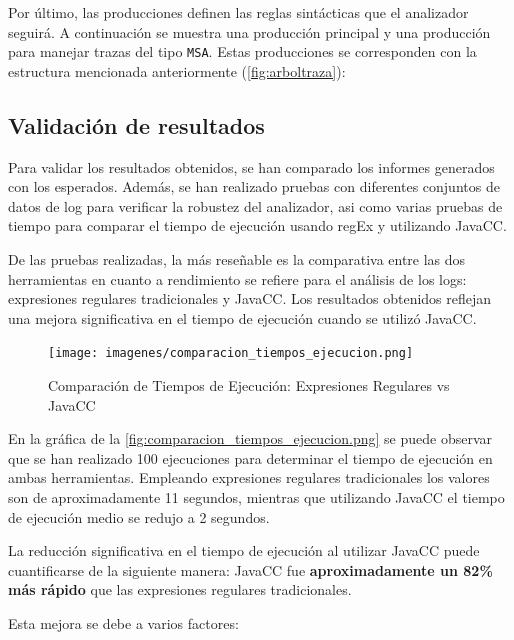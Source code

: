 Por último, las producciones definen las reglas sintácticas que el analizador seguirá. A continuación se muestra una producción principal y una producción para manejar trazas del tipo \lstinline|MSA|. Estas producciones se corresponden con la estructura mencionada anteriormente (\autoref{fig:arboltraza}):

\lstset{inputencoding=utf8/latin1}


\subsection{Validación de resultados}

\noindent Para validar los resultados obtenidos, se han comparado los informes generados con los esperados. Además, se han realizado pruebas con diferentes conjuntos de datos de log para verificar la robustez del analizador, asi como varias pruebas de tiempo para comparar el tiempo de ejecución usando regEx y utilizando JavaCC. 

De las pruebas realizadas, la más reseñable es la comparativa entre las dos herramientas en cuanto a rendimiento se refiere para el análisis de los logs: expresiones regulares tradicionales y JavaCC. Los resultados obtenidos reflejan una mejora significativa en el tiempo de ejecución cuando se utilizó JavaCC.

\begin{figure}[H]
\centering
\texttt{[image: imagenes/comparacion\_tiempos\_ejecucion.png]}
\caption{Comparación de Tiempos de Ejecución: Expresiones Regulares vs JavaCC}
\label{fig:comparacion_tiempos_ejecucion.png}
\end{figure}

\noindent En la gráfica de la \autoref{fig:comparacion_tiempos_ejecucion.png} se puede observar que se han realizado 100 ejecuciones para determinar el tiempo de ejecución en ambas herramientas. Empleando expresiones regulares tradicionales los valores son de aproximadamente 11 segundos, mientras que utilizando JavaCC el tiempo de ejecución medio se redujo a 2 segundos.

La reducción significativa en el tiempo de ejecución al utilizar JavaCC puede cuantificarse de la siguiente manera: JavaCC fue \textbf{aproximadamente un 82\% más rápido} que las expresiones regulares tradicionales.

Esta mejora se debe a varios factores:

